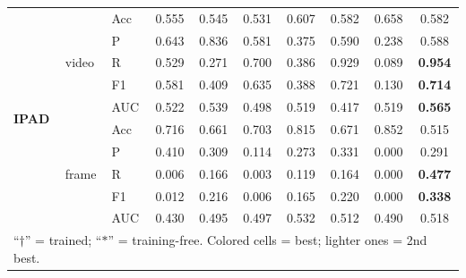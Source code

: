 \documentclass[runningheads]{llncs}
\begin{document}
\begin{table}[t]
{\begin{tabular}{lll cc cc cc c}
\multirow{10}{*}{\textbf{IPAD}} & \multirow{5}{*}{video}
  & Acc & 0.555 & 0.545 & 0.531 & \cellcolor{cellRedLight}0.607 & 0.582 & \cellcolor{cellRed}0.658 & 0.582 \\
& & P   & \cellcolor{cellRedLight}0.643 & \cellcolor{cellRed}0.836 & 0.581 & 0.375 & 0.590 & 0.238 & 0.588 \\
& & R   & 0.529 & 0.271 & 0.700 & 0.386 & \cellcolor{cellRedLight}0.929 & 0.089 & \cellcolor{cellRed}\textbf{0.954} \\
& & F1  & 0.581 & 0.409 & 0.635 & 0.388 & \cellcolor{cellRed}0.721 & 0.130 & \cellcolor{cellRedLight}\textbf{0.714} \\
& & AUC & 0.522 & \cellcolor{cellRedLight}0.539 & 0.498 & 0.519 & 0.417 & 0.519 & \cellcolor{cellRed}\textbf{0.565} \\
\cline{2-10}
& \multirow{5}{*}{frame}
  & Acc & 0.716 & 0.661 & 0.703 & \cellcolor{cellBlueLight}0.815 & 0.671 & \cellcolor{cellBlue}0.852 & 0.515 \\
& & P   & \cellcolor{cellBlue}0.410 & 0.309 & 0.114 & 0.273 & \cellcolor{cellBlueLight}0.331 & 0.000 & 0.291 \\
& & R   & 0.006 & \cellcolor{cellBlueLight}0.166 & 0.003 & 0.119 & 0.164 & 0.000 & \cellcolor{cellBlue}\textbf{0.477} \\
& & F1  & 0.012 & 0.216 & 0.006 & 0.165 & \cellcolor{cellBlueLight}0.220 & 0.000 & \cellcolor{cellBlue}\textbf{0.338} \\
& & AUC & 0.430 & 0.495 & 0.497 & \cellcolor{cellBlue}0.532 & 0.512 & 0.490 & \cellcolor{cellBlueLight}0.518 \\
\bottomrule
\multicolumn{10}{l}{\scriptsize ``$\dagger$'' = trained; ``$\ast$'' = training-free. Colored cells = best; lighter ones = 2nd best.}\\
\end{tabular}%
}
\end{table}
\end{document}
